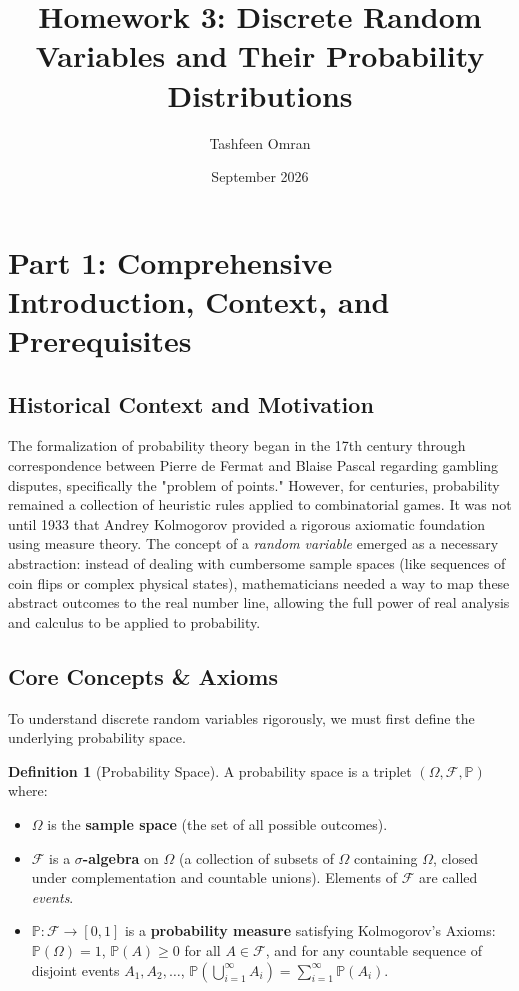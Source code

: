 \documentclass[11pt,letterpaper]{article}
\title{\textbf{Homework 3: Discrete Random Variables and Their Probability Distributions}}
\author{Tashfeen Omran}
\date{September 2026}
\theoremstyle{definition}
\newtheorem{definition}{Definition}[section]
\theoremstyle{plain}
\theoremstyle{remark}
\newcommand{\Prob}{\mathbb{P}}
\newcommand{\F}{\mathcal{F}}
\begin{document}
\maketitle
\tableofcontents
\newpage

\section{Part 1: Comprehensive Introduction, Context, and Prerequisites}

\subsection{Historical Context and Motivation}
The formalization of probability theory began in the 17th century through correspondence between Pierre de Fermat and Blaise Pascal regarding gambling disputes, specifically the "problem of points." However, for centuries, probability remained a collection of heuristic rules applied to combinatorial games. It was not until 1933 that Andrey Kolmogorov provided a rigorous axiomatic foundation using measure theory. The concept of a \textit{random variable} emerged as a necessary abstraction: instead of dealing with cumbersome sample spaces (like sequences of coin flips or complex physical states), mathematicians needed a way to map these abstract outcomes to the real number line, allowing the full power of real analysis and calculus to be applied to probability.

\subsection{Core Concepts \& Axioms}
To understand discrete random variables rigorously, we must first define the underlying probability space.

\begin{definition}[Probability Space]
A probability space is a triplet $(\Omega, \F, \Prob)$ where:
\begin{itemize}
    \item $\Omega$ is the \textbf{sample space} (the set of all possible outcomes).
    \item $\F$ is a \textbf{$\sigma$-algebra} on $\Omega$ (a collection of subsets of $\Omega$ containing $\Omega$, closed under complementation and countable unions). Elements of $\F$ are called \textit{events}.
    \item $\Prob: \F \to [0,1]$ is a \textbf{probability measure} satisfying Kolmogorov's Axioms: $\Prob(\Omega) = 1$, $\Prob(A) \ge 0$ for all $A \in \F$, and for any countable sequence of disjoint events $A_1, A_2, \dots$, $\Prob\left(\bigcup_{i=1}^\infty A_i\right) = \sum_{i=1}^\infty \Prob(A_i)$.
\end{itemize}
\end{definition}
\end{document}
